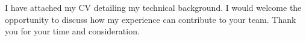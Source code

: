 I have attached my CV detailing my technical background. I would welcome the
opportunity to discuss how my experience can contribute to your team.
Thank you for your time and consideration.
\vspace{2mm}
